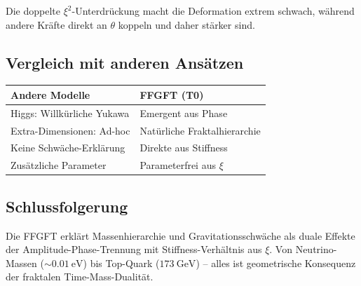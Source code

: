 	Die doppelte \(\xi^2\)-Unterdrückung macht die Deformation extrem schwach, während andere Kräfte direkt an \(\theta\) koppeln und daher stärker sind.
	
	\subsection*{Vergleich mit anderen Ansätzen}
	
	\begin{center}
		\begin{tabular}{p{}p{}}
			\textbf{Andere Modelle} & \textbf{FFGFT (T0)} \\
			\hline
			Higgs: Willkürliche Yukawa & Emergent aus Phase \\
			Extra-Dimensionen: Ad-hoc & Natürliche Fraktalhierarchie \\
			Keine Schwäche-Erklärung & Direkte aus Stiffness \\
			Zusätzliche Parameter & Parameterfrei aus \(\xi\) \\
		\end{tabular}
	\end{center}
	
	\subsection*{Schlussfolgerung}
	
	Die FFGFT erklärt Massenhierarchie und Gravitationsschwäche als duale Effekte der Amplitude-Phase-Trennung mit Stiffness-Verhältnis aus \(\xi\). Von Neutrino-Massen (\(\sim \SI{0.01}{\eV}\)) bis Top-Quark (\(\SI{173}{\GeV}\)) – alles ist geometrische Konsequenz der fraktalen Time-Mass-Dualität.



